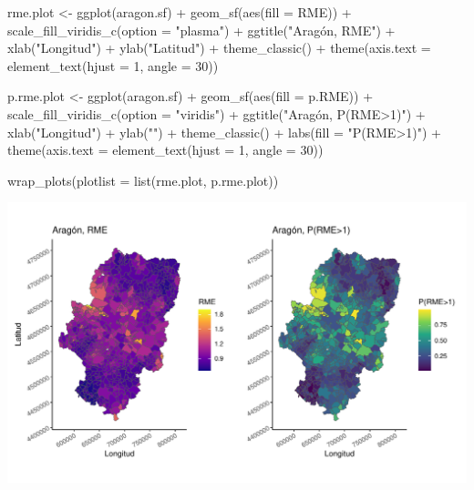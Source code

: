 \documentclass[
  10pt,
  letterpaper,
  DIV=11,
  numbers=noendperiod]{scrartcl}
\newenvironment{Shaded}{\begin{snugshade}}{\end{snugshade}}
\newcommand{\AttributeTok}[1]{\textcolor[rgb]{0.40,0.45,0.13}{#1}}
\newcommand{\DecValTok}[1]{\textcolor[rgb]{0.68,0.00,0.00}{#1}}
\newcommand{\FunctionTok}[1]{\textcolor[rgb]{0.28,0.35,0.67}{#1}}
\newcommand{\NormalTok}[1]{\textcolor[rgb]{0.00,0.23,0.31}{#1}}
\newcommand{\OtherTok}[1]{\textcolor[rgb]{0.00,0.23,0.31}{#1}}
\newcommand{\SpecialCharTok}[1]{\textcolor[rgb]{0.37,0.37,0.37}{#1}}
\newcommand{\StringTok}[1]{\textcolor[rgb]{0.13,0.47,0.30}{#1}}
\begin{document}
\begin{Shaded}
\begin{Highlighting}[]
\NormalTok{rme.plot }\OtherTok{\textless{}{-}} \FunctionTok{ggplot}\NormalTok{(aragon.sf) }\SpecialCharTok{+}
  \FunctionTok{geom\_sf}\NormalTok{(}\FunctionTok{aes}\NormalTok{(}\AttributeTok{fill =}\NormalTok{ RME)) }\SpecialCharTok{+} 
  \FunctionTok{scale\_fill\_viridis\_c}\NormalTok{(}\AttributeTok{option =} \StringTok{"plasma"}\NormalTok{) }\SpecialCharTok{+}
  \FunctionTok{ggtitle}\NormalTok{(}\StringTok{"Aragón, RME"}\NormalTok{) }\SpecialCharTok{+} \FunctionTok{xlab}\NormalTok{(}\StringTok{"Longitud"}\NormalTok{) }\SpecialCharTok{+} \FunctionTok{ylab}\NormalTok{(}\StringTok{"Latitud"}\NormalTok{) }\SpecialCharTok{+}
  \FunctionTok{theme\_classic}\NormalTok{() }\SpecialCharTok{+}
  \FunctionTok{theme}\NormalTok{(}\AttributeTok{axis.text =} \FunctionTok{element\_text}\NormalTok{(}\AttributeTok{hjust =} \DecValTok{1}\NormalTok{, }\AttributeTok{angle =} \DecValTok{30}\NormalTok{)) }

\NormalTok{p.rme.plot }\OtherTok{\textless{}{-}} \FunctionTok{ggplot}\NormalTok{(aragon.sf) }\SpecialCharTok{+}
  \FunctionTok{geom\_sf}\NormalTok{(}\FunctionTok{aes}\NormalTok{(}\AttributeTok{fill =}\NormalTok{ p.RME)) }\SpecialCharTok{+} 
  \FunctionTok{scale\_fill\_viridis\_c}\NormalTok{(}\AttributeTok{option =} \StringTok{"viridis"}\NormalTok{) }\SpecialCharTok{+}
  \FunctionTok{ggtitle}\NormalTok{(}\StringTok{"Aragón, P(RME\textgreater{}1)"}\NormalTok{) }\SpecialCharTok{+} \FunctionTok{xlab}\NormalTok{(}\StringTok{"Longitud"}\NormalTok{) }\SpecialCharTok{+} \FunctionTok{ylab}\NormalTok{(}\StringTok{""}\NormalTok{) }\SpecialCharTok{+}
  \FunctionTok{theme\_classic}\NormalTok{() }\SpecialCharTok{+}
  \FunctionTok{labs}\NormalTok{(}\AttributeTok{fill =} \StringTok{"P(RME\textgreater{}1)"}\NormalTok{) }\SpecialCharTok{+}
  \FunctionTok{theme}\NormalTok{(}\AttributeTok{axis.text =} \FunctionTok{element\_text}\NormalTok{(}\AttributeTok{hjust =} \DecValTok{1}\NormalTok{, }\AttributeTok{angle =} \DecValTok{30}\NormalTok{)) }

\FunctionTok{wrap\_plots}\NormalTok{(}\AttributeTok{plotlist =} \FunctionTok{list}\NormalTok{(rme.plot, p.rme.plot))}
\end{Highlighting}
\end{Shaded}

\begin{center}
\includegraphics{disease_mapping_files/figure-pdf/plot-1.pdf}
\end{center}
\end{document}

